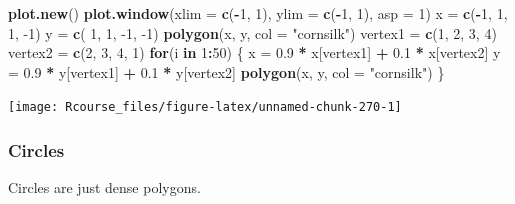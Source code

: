 \documentclass[]{book}
\newenvironment{Shaded}{\begin{snugshade}}{\end{snugshade}}
\newcommand{\ControlFlowTok}[1]{\textcolor[rgb]{0.13,0.29,0.53}{\textbf{#1}}}
\newcommand{\DataTypeTok}[1]{\textcolor[rgb]{0.13,0.29,0.53}{#1}}
\newcommand{\DecValTok}[1]{\textcolor[rgb]{0.00,0.00,0.81}{#1}}
\newcommand{\FloatTok}[1]{\textcolor[rgb]{0.00,0.00,0.81}{#1}}
\newcommand{\KeywordTok}[1]{\textcolor[rgb]{0.13,0.29,0.53}{\textbf{#1}}}
\newcommand{\NormalTok}[1]{#1}
\newcommand{\OperatorTok}[1]{\textcolor[rgb]{0.81,0.36,0.00}{\textbf{#1}}}
\newcommand{\StringTok}[1]{\textcolor[rgb]{0.31,0.60,0.02}{#1}}
\theoremstyle{definition}
\theoremstyle{definition}
\theoremstyle{definition}
\theoremstyle{remark}
\begin{document}
\begin{Shaded}
\begin{Highlighting}[]
\KeywordTok{plot.new}\NormalTok{()}
\KeywordTok{plot.window}\NormalTok{(}\DataTypeTok{xlim =} \KeywordTok{c}\NormalTok{(}\OperatorTok{-}\DecValTok{1}\NormalTok{, }\DecValTok{1}\NormalTok{), }\DataTypeTok{ylim =} \KeywordTok{c}\NormalTok{(}\OperatorTok{-}\DecValTok{1}\NormalTok{, }\DecValTok{1}\NormalTok{), }\DataTypeTok{asp =} \DecValTok{1}\NormalTok{)}
\NormalTok{x =}\StringTok{ }\KeywordTok{c}\NormalTok{(}\OperatorTok{-}\DecValTok{1}\NormalTok{, }\DecValTok{1}\NormalTok{, }\DecValTok{1}\NormalTok{, }\DecValTok{-1}\NormalTok{)}
\NormalTok{y =}\StringTok{ }\KeywordTok{c}\NormalTok{( }\DecValTok{1}\NormalTok{, }\DecValTok{1}\NormalTok{, }\DecValTok{-1}\NormalTok{, }\DecValTok{-1}\NormalTok{)}
\KeywordTok{polygon}\NormalTok{(x, y, }\DataTypeTok{col =} \StringTok{"cornsilk"}\NormalTok{)}
\NormalTok{vertex1 =}\StringTok{ }\KeywordTok{c}\NormalTok{(}\DecValTok{1}\NormalTok{, }\DecValTok{2}\NormalTok{, }\DecValTok{3}\NormalTok{, }\DecValTok{4}\NormalTok{)}
\NormalTok{vertex2 =}\StringTok{ }\KeywordTok{c}\NormalTok{(}\DecValTok{2}\NormalTok{, }\DecValTok{3}\NormalTok{, }\DecValTok{4}\NormalTok{, }\DecValTok{1}\NormalTok{)}
\ControlFlowTok{for}\NormalTok{(i }\ControlFlowTok{in} \DecValTok{1}\OperatorTok{:}\DecValTok{50}\NormalTok{) \{}
\NormalTok{    x =}\StringTok{ }\FloatTok{0.9} \OperatorTok{*}\StringTok{ }\NormalTok{x[vertex1] }\OperatorTok{+}\StringTok{ }\FloatTok{0.1} \OperatorTok{*}\StringTok{ }\NormalTok{x[vertex2]}
\NormalTok{    y =}\StringTok{ }\FloatTok{0.9} \OperatorTok{*}\StringTok{ }\NormalTok{y[vertex1] }\OperatorTok{+}\StringTok{ }\FloatTok{0.1} \OperatorTok{*}\StringTok{ }\NormalTok{y[vertex2]}
    \KeywordTok{polygon}\NormalTok{(x, y, }\DataTypeTok{col =} \StringTok{"cornsilk"}\NormalTok{)}
\NormalTok{\}}
\end{Highlighting}
\end{Shaded}

\texttt{[image: Rcourse\_files/figure-latex/unnamed-chunk-270-1]}

\hypertarget{circles}{%
\subsubsection{Circles}\label{circles}}

Circles are just dense polygons.
\end{document}
